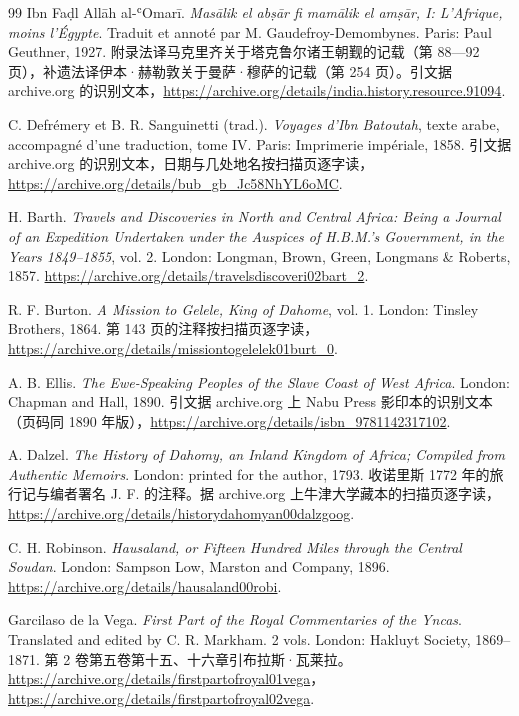 \begin{thebibliography}{99}
 Ibn Faḍl Allāh al-ʿOmarī. \emph{Masālik el abṣār fi mamālik el amṣār, I: L'Afrique, moins l'Égypte}. Traduit et annoté par M. Gaudefroy-Demombynes. Paris: Paul Geuthner, 1927. 附录法译马克里齐关于塔克鲁尔诸王朝觐的记载（第 88—92 页），补遗法译伊本·赫勒敦关于曼萨·穆萨的记载（第 254 页）。引文据 archive.org 的识别文本，\url{https://archive.org/details/india.history.resource.91094}.

 C. Defrémery et B. R. Sanguinetti (trad.). \emph{Voyages d'Ibn Batoutah}, texte arabe, accompagné d'une traduction, tome IV. Paris: Imprimerie impériale, 1858. 引文据 archive.org 的识别文本，日期与几处地名按扫描页逐字读，\url{https://archive.org/details/bub_gb_Jc58NhYL6oMC}.

 H. Barth. \emph{Travels and Discoveries in North and Central Africa: Being a Journal of an Expedition Undertaken under the Auspices of H.B.M.'s Government, in the Years 1849--1855}, vol. 2. London: Longman, Brown, Green, Longmans \& Roberts, 1857. \url{https://archive.org/details/travelsdiscoveri02bart_2}.

 R. F. Burton. \emph{A Mission to Gelele, King of Dahome}, vol. 1. London: Tinsley Brothers, 1864. 第 143 页的注释按扫描页逐字读，\url{https://archive.org/details/missiontogelelek01burt_0}.

 A. B. Ellis. \emph{The Ewe-Speaking Peoples of the Slave Coast of West Africa}. London: Chapman and Hall, 1890. 引文据 archive.org 上 Nabu Press 影印本的识别文本（页码同 1890 年版），\url{https://archive.org/details/isbn_9781142317102}.

 A. Dalzel. \emph{The History of Dahomy, an Inland Kingdom of Africa; Compiled from Authentic Memoirs}. London: printed for the author, 1793. 收诺里斯 1772 年的旅行记与编者署名 J. F. 的注释。据 archive.org 上牛津大学藏本的扫描页逐字读，\url{https://archive.org/details/historydahomyan00dalzgoog}.

 C. H. Robinson. \emph{Hausaland, or Fifteen Hundred Miles through the Central Soudan}. London: Sampson Low, Marston and Company, 1896. \url{https://archive.org/details/hausaland00robi}.

 Garcilaso de la Vega. \emph{First Part of the Royal Commentaries of the Yncas}. Translated and edited by C. R. Markham. 2 vols. London: Hakluyt Society, 1869--1871. 第 2 卷第五卷第十五、十六章引布拉斯·瓦莱拉。\url{https://archive.org/details/firstpartofroyal01vega}，\url{https://archive.org/details/firstpartofroyal02vega}.


\end{thebibliography}
